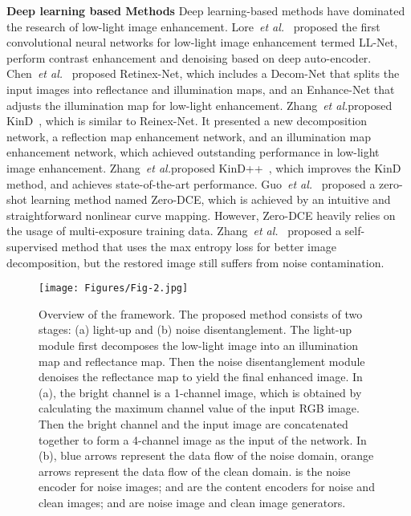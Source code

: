 \documentclass[journal]{IEEEtran}
\newcommand{\etal}{{\emph{et al.}}}
\begin{document}
\textbf{Deep learning based Methods} Deep learning-based methods have dominated the research of low-light image enhancement. Lore~\etal~\cite{lore2017llnet} proposed the first convolutional neural networks for low-light image enhancement termed LL-Net, perform contrast enhancement and denoising based on deep auto-encoder. Chen~\etal~\cite {Chen2018Retinex} proposed Retinex-Net, which includes a Decom-Net that splits the input images into reflectance and illumination maps, and an Enhance-Net that adjusts the illumination map for low-light enhancement. Zhang~\etal proposed KinD~\cite{zhang2019kindling}, which is similar to Reinex-Net. It presented a new decomposition network, a reflection map enhancement network, and an illumination map enhancement network, which achieved outstanding performance in low-light image enhancement. Zhang~\etal proposed KinD++~\cite{zhang2021beyond}, which improves the KinD method, and achieves state-of-the-art performance. Guo~\etal~\cite{guo2020zero} proposed a zero-shot learning method named Zero-DCE, which is achieved by an intuitive and straightforward nonlinear curve mapping. However, Zero-DCE heavily relies on the usage of multi-exposure training data. Zhang~\etal~\cite{zhang2020self} proposed a self-supervised method that uses the max entropy loss for better image decomposition, but the restored image still suffers from noise contamination.
\begin{figure*}[htbp]
\centering
\texttt{[image: Figures/Fig-2.jpg]}
\caption{Overview of the framework. The proposed method consists of two stages: (a) light-up and (b) noise disentanglement. The light-up module first decomposes the low-light image into an illumination map and reflectance map. Then the noise disentanglement module denoises the reflectance map to yield the final enhanced image. In (a), the bright channel is a 1-channel image, which is obtained by calculating the maximum channel value of the input RGB image. Then the bright channel and the input image are concatenated together to form a 4-channel image as the input of the network. In (b), blue arrows represent the data flow of the noise domain, orange arrows represent the data flow of the clean domain.  is the noise encoder for noise images;  and  are the content encoders for noise and clean images;  and  are noise image and clean image generators.}
\label{fig arc}
\end{figure*}
\end{document}
